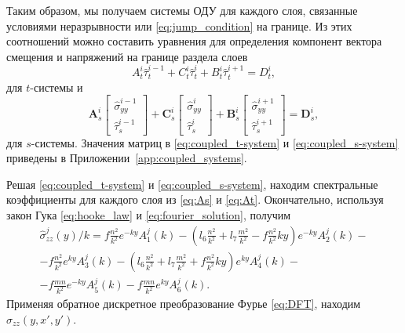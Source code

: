 Таким образом, мы получаем системы ОДУ для каждого слоя, связанные условиями неразрывности или \eqref{eq:jump_condition} на границе. Из этих соотношений можно составить уравнения для определения компонент вектора смещения и напряжений на границе раздела слоев
\begin{equation}
    \label{eq:coupled_t-system}
    A_t^i \hat{\tau}_t^{i-1} + C_t^i \hat{\tau}_t^{i} + B_t^i \hat{\tau}_t^{i+1} = D_t^i,
\end{equation}
для $t$-системы и 
\begin{equation}
    \label{eq:coupled_s-system}
    \textbf{A}_s^i \left[
        \begin{array}{c}
            \hat{\sigma}_{yy}^{i-1} \\
            \hat{\tau}_s^{i-1}
        \end{array}\right] +
    \textbf{C}_s^i \left[
        \begin{array}{c}
            \hat{\sigma}_{yy}^{i} \\
            \hat{\tau}_s^{i}
        \end{array}\right] + 
    \textbf{B}_s^i \left[
        \begin{array}{c}
            \hat{\sigma}_{yy}^{i+1} \\
            \hat{\tau}_s^{i+1}
        \end{array}\right]
    = \textbf{D}_s^i,
\end{equation}
для $s$-системы. Значения матриц в \eqref{eq:coupled_t-system} и \eqref{eq:coupled_s-system} приведены в Приложении~\ref{app:coupled_systems}.

Решая \eqref{eq:coupled_t-system} и \eqref{eq:coupled_s-system}, находим спектральные коэффициенты для каждого слоя из \eqref{eq:As} и \eqref{eq:At}. Окончательно, используя закон Гука \eqref{eq:hooke_law} и \eqref{eq:fourier_solution}, получим
\begin{multline}
    \label{eq:fourier_sigmazz}
    \hat{\sigma}^j_{zz}(y)/k = f\frac{n^2}{k^2}e^{-ky}A^j_1(k)
    - \left(l_6\frac{n^2}{k^2}+l_7\frac{m^2}{k^2}-f\frac{n^2}{k^2}ky \right)e^{-ky}A^j_2(k) - \\
    - f\frac{n^2}{k^2}e^{ky}A^j_3(k)
    - \left(l_6\frac{n^2}{k^2}+l_7\frac{m^2}{k^2}+f\frac{n^2}{k^2}ky \right)e^{ky}A^j_4(k) - \\
    - f\frac{mn}{k^2}e^{-ky}A^j_5(k)
    - f\frac{mn}{k^2}e^{ky}A^j_6(k).
\end{multline}
Применяя обратное дискретное преобразование Фурье \eqref{eq:DFT}, находим $\sigma_{zz}(y,x',y')$.

